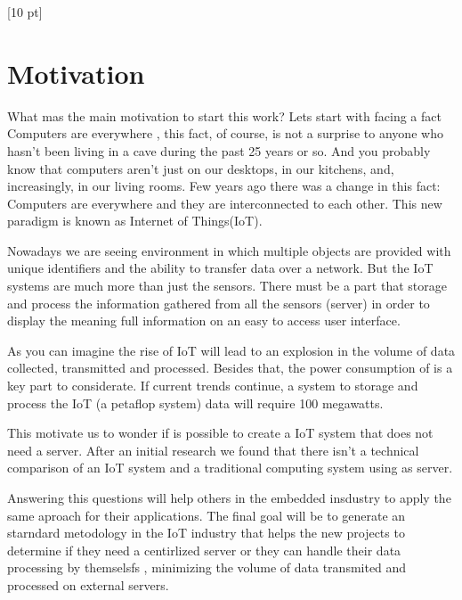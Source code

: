 \titleformat{\chapter}{\Huge\bfseries}{\thechapter}{0 pt}{\rule{340 pt}{3 pt}\\}
\titlespacing{\chapter}{100 pt}{-25 pt}{40 pt}[10 pt]	
\pagestyle{fancy}
\fancyhead[RO,RE]{\thepage}
\fancyfoot[CO,CE]{}

\chapter*{Motivation}

\normalsize
\noindent


What mas the main motivation to start this work? Lets start with facing a fact
Computers are everywhere , this fact, of course, is not a surprise to anyone
who hasn't been living in a cave during the past 25 years or so. And you
probably know that computers aren't just on our desktops, in our kitchens, and,
increasingly, in our living rooms. Few years ago there was a change in this
fact: Computers are everywhere and they are interconnected to each other.  This
new paradigm is known as Internet of Things(IoT). 

Nowadays we are seeing environment in which multiple objects are provided with
unique identifiers and the ability to transfer data over a network. But the IoT
systems are much more than just the sensors. There must be a part that storage
and process the information gathered from all the sensors (server) in order to
display the meaning full information on an easy to access user interface. 

As you can imagine the rise of IoT will lead to an explosion in the volume of
data collected, transmitted and processed. Besides that, the power consumption
of  is a key part to considerate. If current trends continue, a system to
storage and process the IoT (a petaflop system) data will require 100
megawatts. 

This motivate us to wonder if is possible to create a IoT system that does
not need a server. After an initial research we found that there isn't a
technical comparison of an  IoT system and a traditional computing system
using as server. 

Answering this questions will help others in the embedded insdustry to apply
the same aproach for their applications. The final goal will be to generate
an starndard metodology in the IoT industry that helps the new projects to 
determine if they need a centirlized server or they can handle their data processing by
themselsfs , minimizing the volume of data transmited and processed on external
servers. 


\clearpage
